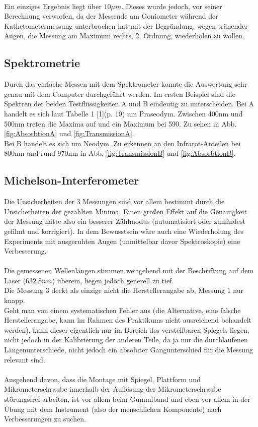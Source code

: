 \documentclass[12pt,a4paper]{article}
\begin{document}
\begin{multicols}{2}
\\
Ein einziges Ergebnis liegt über $10\mu m$. Dieses wurde jedoch, vor seiner Berechnung verworfen, da der Messende am Goniometer während der Kathetometermessung unterbrochen hat mit der Begründung, wegen tränender Augen, die Messung am Maximum rechts, 2. Ordnung, wiederholen zu wollen.\\



\subsection{Spektrometrie}
Durch das einfache Messen mit dem Spektrometer konnte die Auswertung sehr genau mit dem Computer durchgeführt werden. Im ersten Beispiel sind die Spektren der beiden Testflüssigkeiten A und B eindeutig zu unterscheiden. Bei A handelt es sich laut Tabelle 1 [1](p. 19) um Praseodym. Zwischen 400nm und 500nm treten die Maxima auf und ein Maximum bei 590. Zu sehen in Abb. \ref{fig:AbsorbtionA} und \ref{fig:TransmissionA}.\\
Bei B handelt es sich um Neodym. Zu erkennen an den Infrarot-Anteilen bei 800nm und rund 970nm in Abb. \ref{fig:TransmissionB} und \ref{fig:AbsorbtionB}.\\




\subsection{Michelson-Interferometer}

Die Unsicherheiten der 3 Messungen sind vor allem bestimmt durch die Unsicherheiten der gezählten Minima. Einen großen Effekt auf die Genauigkeit der Messung hätte also ein besserer Zählmodus (automatisiert oder zumindest gefilmt und korrigiert). In dem Bewusstsein wäre auch eine Wiederholung des Experiments mit ausgeruhten Augen (unmittelbar davor Spektroskopie) eine Verbesserung.\\
\\
Die gemessenen Wellenlängen stimmen weitgehend mit der Beschriftung auf dem Laser ($632.8nm$) überein, liegen jedoch generell zu tief. \\
Die Messung 3 deckt als einzige nicht die Herstellerangabe ab, Messung 1 nur knapp.\\
Geht man von einem systematischen Fehler aus (die Alternative, eine falsche Herstellerangabe, kann im Rahmen des Praktikums nicht ausreichend behandelt werden), kann dieser eigentlich nur im Bereich des verstellbaren Spiegels liegen, nicht jedoch in der Kalibrierung der anderen Teile, da ja nur die durchlaufenen Längenunterschiede, nicht jedoch ein absoluter Gangunterschied für die Messung relevant sind.\\
\\
Ausgehend davon, dass die Montage mit Spiegel, Plattform und Mikrometerschraube innerhalb der Auflösung der Mikrometerschraube störungsfrei arbeiten, ist vor allem beim Gummiband und eben vor allem in der Übung mit dem Instrument (also der menschlichen Komponente) nach Verbesserungen zu suchen.



\end{multicols}
\end{document}
